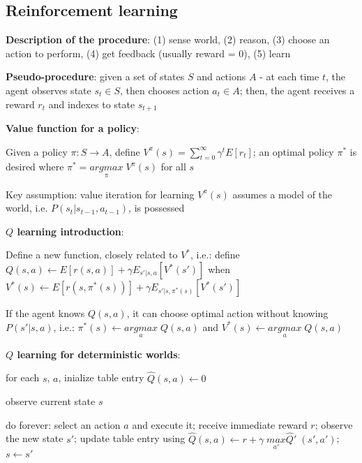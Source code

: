 \documentclass[letterpaper,fontsize=5pt]{scrartcl}
\renewenvironment{enumerate}[1]{\begin{compactenum}#1}{\end{compactenum}}
\theoremstyle{definition}
\begin{document}
\begin{multicols}{2}
\section{Reinforcement learning}
	\begin{enumerate}
		\item \textbf{Description of the procedure}: (1) sense world, (2) reason, (3) choose an action to perform, (4) get feedback (usually reward = 0), (5) learn
		\item \textbf{Pseudo-procedure}: given a set of states $S$ and actions $A$ - at each time $t$, the agent observes state $s_t \in S$, then chooses action $a_t \in A$; then, the agent receives a reward $r_t$ and indexes to state $s_{t+1}$
		\item \textbf{Value function for a policy}:
			\begin{enumerate}
				\item Given a policy $\pi : S \rightarrow A$, define $V^\pi(s) = \sum\limits_{t=0}^\infty \gamma^t E[r_t]$; an optimal policy $\pi^*$ is desired where $\pi^* = \underset{\pi}{argmax}\;V^\pi(s)$ for all $s$
				\item Key assumption: value iteration for learning $V^\pi (s)$ assumes a model of the world, i.e. $P(s_t|s_{t-1}, a_{t-1})$, is possessed
			\end{enumerate}
		\item \textbf{$Q$ learning introduction}: 
			\begin{enumerate}
				\item Define a new function, closely related to $V^*$, i.e.: define $Q(s,a) \leftarrow E[r(s,a)] + \gamma E_{s'|s,a}[V^*(s')]$ when $V^* (s) \leftarrow E[r(s,\pi^*(s))] + \gamma E_{s'|s,\pi^*(s)}[V^*(s')]$
				\item If the agent knows $Q(s,a)$, it can choose optimal action without knowing $P(s'|s,a)$, i.e.: $\pi^*(s) \leftarrow \underset{a}{argmax}\;Q(s,a)$ and $V^*(s) \leftarrow \underset{a}{argmax}\;Q(s,a)$				
			\end{enumerate}
		\item \textbf{$Q$ learning for deterministic worlds}:
			\begin{enumerate}
				\item for each $s$, $a$, inialize table entry $\hat{Q}(s,a) \leftarrow 0$
				\item observe current state $s$
				\item do forever: select an action $a$ and execute it; receive immediate reward $r$; observe the new state $s'$; update table entry using $\hat{Q}(s,a) \leftarrow r + \gamma\;\underset{a'}{max} \hat{Q}'\;(s',a')$; $s \leftarrow s'$
			\end{enumerate}
	\end{enumerate}
\clearpage  %


%

\end{multicols}

\end{document}
